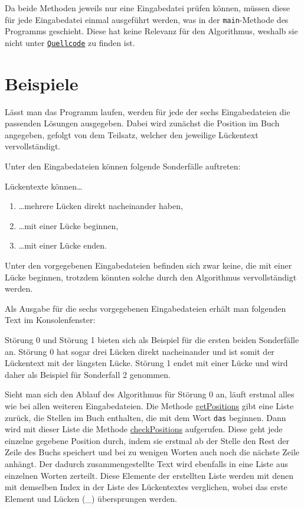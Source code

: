 \documentclass[a4paper, 10pt, ngerman]{scrartcl}
\begin{document}
Da beide Methoden jeweils nur eine Eingabedatei prüfen können,
müssen diese für jede Eingabedatei einmal ausgeführt werden,
was in der \texttt{main}-Methode des Programms geschieht.
Diese hat keine Relevanz für den Algorithmus,
weshalb sie nicht unter \hyperref[sec:quellcode]{\texttt{Quellcode}} zu finden ist.
		

\section{Beispiele}\label{sec:beispiele}
Lässt man das Programm laufen,
werden für jede der sechs Eingabedateien die passenden Lösungen ausgegeben.
Dabei wird zunächst die Position im Buch angegeben,
gefolgt von dem Teilsatz,
welcher den jeweilige Lückentext vervollständigt.

Unter den Eingabedateien können folgende Sonderfälle auftreten:

Lückentexte können\ldots

\begin{enumerate}
	\item \ldots mehrere Lücken direkt nacheinander haben,
	\item \ldots mit einer Lücke beginnen,
	\item \ldots mit einer Lücke enden.
\end{enumerate}
		
		Unter den vorgegebenen Eingabedateien befinden sich zwar keine,
		die mit einer Lücke beginnen,
		trotzdem könnten solche durch den Algorithmus vervollständigt werden.
		
		Als Ausgabe für die sechs vorgegebenen Eingabedateien erhält man folgenden Text im Konsolenfenster:


		
		Störung 0 und Störung 1 bieten sich als Beispiel für die ersten beiden Sonderfälle an.
		Störung 0 hat sogar drei Lücken direkt nacheinander
		und ist somit der Lückentext mit der längsten Lücke.
		Störung 1 endet mit einer Lücke und wird daher als Beispiel für Sonderfall 2 genommen.
		
		Sieht man sich den Ablauf des Algorithmus für Störung 0 an,
		läuft erstmal alles wie bei allen weiteren Eingabedateien.
		Die Methode \hyperref[lst:getPosition]{getPositions} gibt eine Liste zurück,
		die Stellen im Buch enthalten,
		die mit dem Wort \texttt{das} beginnen.
		Dann wird mit dieser Liste die Methode \hyperref[lst:checkPosition]{checkPositions} aufgerufen.
		Diese geht jede einzelne gegebene Position durch,
		indem sie erstmal ab der Stelle den Rest der Zeile des Buchs speichert
		und bei zu wenigen Worten auch noch die nächste Zeile anhängt.
		Der dadurch zusammengestellte Text wird ebenfalls in eine Liste aus einzelnen Worten zerteilt.
		Diese Elemente der erstellten Liste werden mit denen mit demselben Index in der Liste des Lückentextes verglichen,
		wobei das erste Element und Lücken (\_) übersprungen werden.
\clearpage
\end{document}
